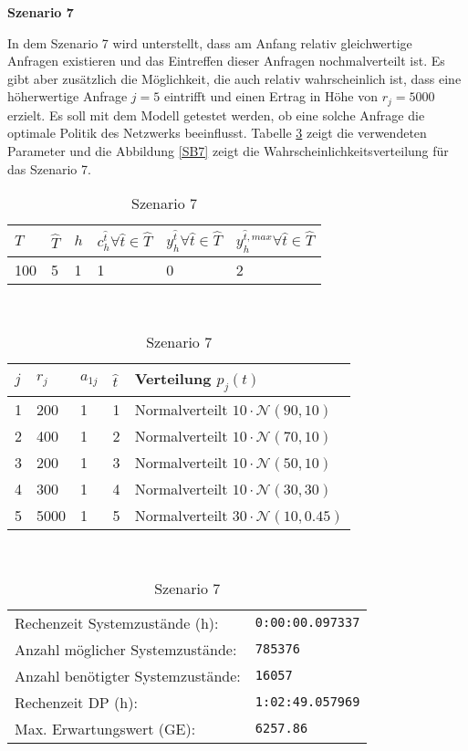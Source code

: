 \textbf{Szenario 7}

In dem Szenario 7 wird unterstellt, dass am Anfang relativ gleichwertige Anfragen existieren und das Eintreffen dieser Anfragen nochmalverteilt ist. Es gibt aber zusätzlich die Möglichkeit, die auch relativ wahrscheinlich ist, dass eine höherwertige Anfrage $j=5$ eintrifft und einen Ertrag in Höhe von $r_j=5000$ erzielt. Es soll mit dem Modell getestet werden, ob eine solche Anfrage die optimale Politik des Netzwerks beeinflusst. Tabelle \ref{S7} zeigt die verwendeten Parameter und die Abbildung \ref{SB7} zeigt die Wahrscheinlichkeitsverteilung für das Szenario 7.


\begin{table}[h!]
\renewcommand{\arraystretch}{1.5}
  \begin{center}
    \caption{Szenario 7}  \label{S7}
    \vspace*{3mm}
    \begin{tabular}{l l l l l l}   %
    $T$ & $\hat T$  & $h$ & $c_h^{\hat t}\forall \hat{t}\in{\hat T}$ & $y_h^{\hat t}\forall \hat{t}\in{\hat T}$  & $y_h^{{\hat t},max}\forall \hat{t}\in{\hat T}$  \\  \hline
100 & 5 & 1 & 1 & 0 & 2  \\ \hline
    \end{tabular} \\[3mm]
        \begin{tabular}{p{1cm} p{1cm} p{1cm}  p{1cm} p{6cm}}   %
    $j$ & $r_j$  & $a_{1j}$ & $\hat t$ & Verteilung $p_j(t)$ \\  \hline
1 & 200 & 1 & 1 & Normalverteilt $10\cdot\mathcal{N}(90, 10)$   \\
2 & 400 & 1 & 2 & Normalverteilt $10\cdot\mathcal{N}(70, 10)$  \\
3 & 200 & 1 & 3 & Normalverteilt $10\cdot\mathcal{N}(50, 10)$  \\
4 & 300 & 1 & 4 & Normalverteilt $10\cdot\mathcal{N}(30, 30)$  \\
5 & 5000 & 1 & 5 & Normalverteilt $30\cdot\mathcal{N}(10, 0.45)$ \\
\hline
    \end{tabular} \\[3mm]
     \begin{tabular}{p{7cm}p{5cm}} \hline
     Rechenzeit Systemzustände (h): & \texttt{0:00:00.097337} \\
     Anzahl möglicher Systemzustände: & \texttt{785376} \\
     Anzahl benötigter Systemzustände: & \texttt{16057} \\ 
     Rechenzeit DP (h): & \texttt{1:02:49.057969} \\ 
          Max. Erwartungswert (GE): & \texttt{6257.86} \\ \hline
         \end{tabular} \\[3mm]
  \end{center}
\end{table}

